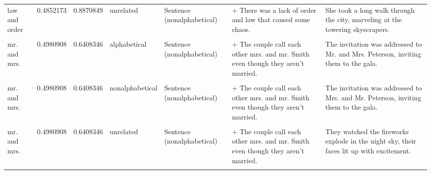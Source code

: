 \documentclass[
  12pt,
]{scrartcl}
\begin{document}
\begin{landscape}
\begin{longtable}{lrrllll}
law and order & 0.4852173 & 0.8870849 & unrelated & Sentence (nonalphabetical) & + There was a lack of order and law that caused some chaos. & She took a long walk through the city, marveling at the towering skyscrapers.\\
\cellcolor{gray!6}{mr. and mrs.} & \cellcolor{gray!6}{0.4980908} & \cellcolor{gray!6}{0.6408346} & \cellcolor{gray!6}{alphabetical} & \cellcolor{gray!6}{Sentence (alphabetical)} & \cellcolor{gray!6}{+ The couple call each other mr. and mrs. Smith even though they aren't married.} & \cellcolor{gray!6}{The invitation was addressed to Mr. and Mrs. Peterson, inviting them to the gala.}\\
mr. and mrs. & 0.4980908 & 0.6408346 & alphabetical & Sentence (nonalphabetical) & + The couple call each other mrs. and mr. Smith even though they aren't married. & The invitation was addressed to Mr. and Mrs. Peterson, inviting them to the gala.\\
\addlinespace
\cellcolor{gray!6}{mr. and mrs.} & \cellcolor{gray!6}{0.4980908} & \cellcolor{gray!6}{0.6408346} & \cellcolor{gray!6}{nonalphabetical} & \cellcolor{gray!6}{Sentence (alphabetical)} & \cellcolor{gray!6}{+ The couple call each other mr. and mrs. Smith even though they aren't married.} & \cellcolor{gray!6}{The invitation was addressed to Mrs. and Mr. Peterson, inviting them to the gala.}\\
mr. and mrs. & 0.4980908 & 0.6408346 & nonalphabetical & Sentence (nonalphabetical) & + The couple call each other mrs. and mr. Smith even though they aren't married. & The invitation was addressed to Mrs. and Mr. Peterson, inviting them to the gala.\\
\cellcolor{gray!6}{mr. and mrs.} & \cellcolor{gray!6}{0.4980908} & \cellcolor{gray!6}{0.6408346} & \cellcolor{gray!6}{unrelated} & \cellcolor{gray!6}{Sentence (alphabetical)} & \cellcolor{gray!6}{+ The couple call each other mr. and mrs. Smith even though they aren't married.} & \cellcolor{gray!6}{They watched the fireworks explode in the night sky, their faces lit up with excitement.}\\
mr. and mrs. & 0.4980908 & 0.6408346 & unrelated & Sentence (nonalphabetical) & + The couple call each other mrs. and mr. Smith even though they aren't married. & They watched the fireworks explode in the night sky, their faces lit up with excitement.\\
\cellcolor{gray!6}{men and women} & \cellcolor{gray!6}{0.4064281} & \cellcolor{gray!6}{0.7288978} & \cellcolor{gray!6}{alphabetical} & \cellcolor{gray!6}{Sentence (alphabetical)} & \cellcolor{gray!6}{+ Jen thought that the men and women in her dance class were all very talented.} & \cellcolor{gray!6}{The disparity between the wages of men and women in the workforce is a major concern for many.}\\

\end{longtable}
\end{landscape}
\end{document}

